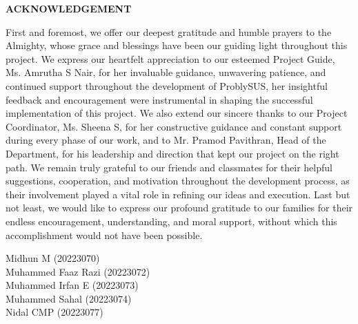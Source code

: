 \clearpage
{}
{}
\thispagestyle{footeronly}

\begin{center}
{\Large \textbf{ACKNOWLEDGEMENT}}
\end{center}

\justifying
\noindent
First and foremost, we offer our deepest gratitude and humble prayers to the Almighty, whose grace and blessings have been our guiding light throughout this project. We express our heartfelt appreciation to our esteemed Project Guide, Ms. Amrutha S Nair, for her invaluable guidance, unwavering patience, and continued support throughout the development of ProblySUS, her insightful feedback and encouragement were instrumental in shaping the successful implementation of this project. We also extend our sincere thanks to our Project Coordinator, Ms. Sheena S, for her constructive guidance and constant support during every phase of our work, and to Mr. Pramod Pavithran, Head of the Department, for his leadership and direction that kept our project on the right path. We remain truly grateful to our friends and classmates for their helpful suggestions, cooperation, and motivation throughout the development process, as their involvement played a vital role in refining our ideas and execution. Last but not least, we would like to express our profound gratitude to our families for their endless encouragement, understanding, and moral support, without which this accomplishment would not have been possible.

\vspace{1.5cm}
\noindent
Midhun M (20223070)\\
Muhammed Faaz Razi (20223072)\\
Muhammed Irfan E (20223073)\\
Muhammed Sahal (20223074)\\
Nidal CMP (20223077)\\

\vfill
\clearpage
